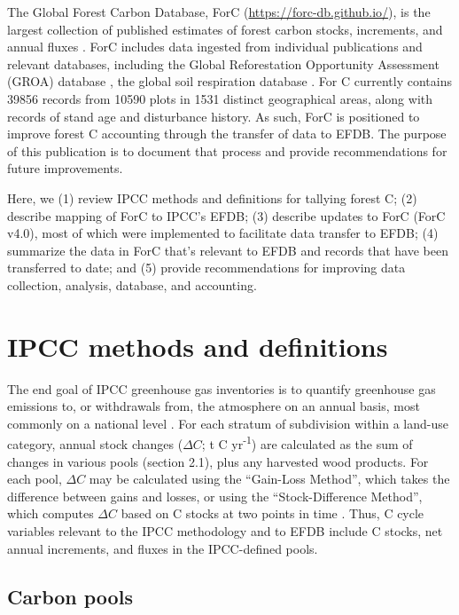 \documentclass[, manuscript]{copernicus}
\begin{document}
The Global Forest Carbon Database, ForC
(\url{https://forc-db.github.io/}), is the largest collection of
published estimates of forest carbon stocks, increments, and annual
fluxes
\citep{anderson-teixeira_forc_2018, anderson-teixeira_carbon_2021}. ForC
includes data ingested from individual publications and relevant
databases, including the Global Reforestation Opportunity Assessment
(GROA) database \citep[database doi:
10.5281/zenodo.3983644]{cook-patton_mapping_2020}, the global soil
respiration database
\citep[SRDB-V5,][]{bond-lamberty_global_2010, jian_restructured_2021}.
For C currently contains 39856 records from 10590 plots in 1531 distinct
geographical areas, along with records of stand age and disturbance
history. As such, ForC is positioned to improve forest C accounting
through the transfer of data to EFDB. The purpose of this publication is
to document that process and provide recommendations for future
improvements.

Here, we (1) review IPCC methods and definitions for tallying forest C;
(2) describe mapping of ForC to IPCC's EFDB; (3) describe updates to
ForC (ForC v4.0), most of which were implemented to facilitate data
transfer to EFDB; (4) summarize the data in ForC that's relevant to EFDB
and records that have been transferred to date; and (5) provide
recommendations for improving data collection, analysis, database, and
accounting.

\section{IPCC methods and definitions}

The end goal of IPCC greenhouse gas inventories is to quantify
greenhouse gas emissions to, or withdrawals from, the atmosphere on an
annual basis, most commonly on a national level
\citep{ipcc_2006_2006, ipcc_2019_2019}. For each stratum of subdivision
within a land-use category, annual stock changes (\(\Delta C\); t C
yr\textsuperscript{-1}) are calculated as the sum of changes in various
pools (section 2.1), plus any harvested wood products. For each pool,
\(\Delta C\) may be calculated using the ``Gain-Loss Method'', which
takes the difference between gains and losses, or using the
``Stock-Difference Method'', which computes \(\Delta C\) based on C
stocks at two points in time \citep{ipcc_2006_2006}. Thus, C cycle
variables relevant to the IPCC methodology and to EFDB include C stocks,
net annual increments, and fluxes in the IPCC-defined pools.

\subsection{Carbon pools}
\end{document}
